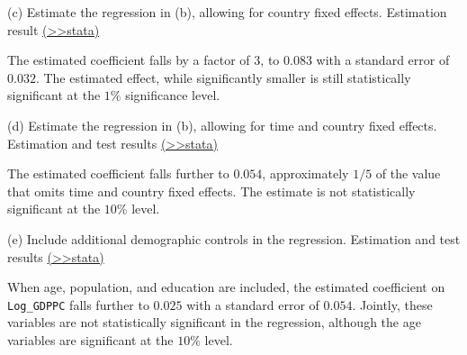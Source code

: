 \documentclass[
  10pt,
  ignorenonframetext,
]{beamer}
\begin{document}
\begin{frame}{(c) Estimate the regression in (b), allowing for country
fixed effects.}
\protect\hypertarget{Ex2-CountryFEs-A}{}
Estimation result
\footnotesize \protect\hyperlink{Ex2-CountryFEs}{(\textgreater\textgreater stata)}
\normalsize

The estimated coefficient falls by a factor of \(3\), to \(0.083\) with
a standard error of \(0.032\). The estimated effect, while significantly
smaller is still statistically significant at the \(1\%\) significance
level.
\end{frame}

\begin{frame}{(d) Estimate the regression in (b), allowing for time and
country fixed effects.}
\protect\hypertarget{Ex2-BothFEs-A}{}
Estimation and test results
\footnotesize \protect\hyperlink{Ex2-BothFEs}{(\textgreater\textgreater stata)}
\normalsize

The estimated coefficient falls further to \(0.054\), approximately
\(1/5\) of the value that omits time and country fixed effects. The
estimate is not statistically significant at the \(10\%\) level.
\end{frame}

\begin{frame}[fragile]{(e) Include additional demographic controls in
the regression.}
\protect\hypertarget{Ex2-BothFEswithcontrols-A}{}
Estimation and test results
\footnotesize \protect\hyperlink{Ex2-BothFEswithcontrols}{(\textgreater\textgreater stata)}
\normalsize

When age, population, and education are included, the estimated
coefficient on \texttt{Log\_GDPPC} falls further to \(0.025\) with a
standard error of \(0.054\). Jointly, these variables are not
statistically significant in the regression, although the age variables
are significant at the \(10\%\) level.
\end{frame}
\end{document}
